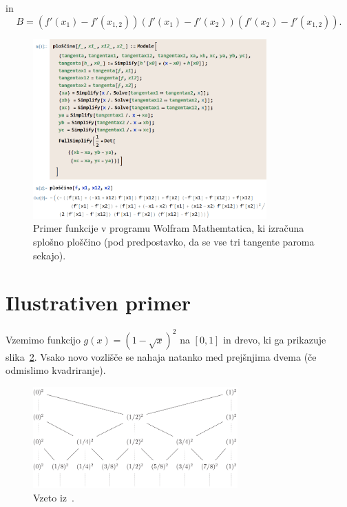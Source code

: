 \documentclass[a4paper, 12pt, titlepage]{article}
\begin{document}
in
$$
B = (f'(x_1) - f'(x_{1,2}))(f'(x_1) - f'(x_2))(f'(x_2) - f'(x_{1,2}))\text{.}
$$

\begin{figure}[h!]
    \centering
    \includegraphics[width=0.8\textwidth]{slike/splosna_ploscina.png}
    \caption{Primer funkcije v programu Wolfram Mathemtatica, ki izračuna splošno ploščino (pod predpostavko, da se vse tri tangente paroma sekajo).}
    \label{splosna_ploscina}
\end{figure}


\section{Ilustrativen primer} \label{ilustrativen_primer}

Vzemimo funkcijo $ g(x) = (1 - \sqrt{x})^2 $ na $ [0, 1] $ in drevo, ki ga prikazuje slika~\ref{ilustrativen_primer_drevo}. Vsako novo vozlišče se nahaja natanko med prejšnjima dvema (če odmislimo kvadriranje).

\begin{figure}[h]
    \centering
    \includegraphics[width=0.7\textwidth]{slike/ilustrativen_primer_drevo.png}
    \caption{Vzeto iz~\cite{osnovni_clanek}.}
    \label{ilustrativen_primer_drevo}
\end{figure}
\end{document}
